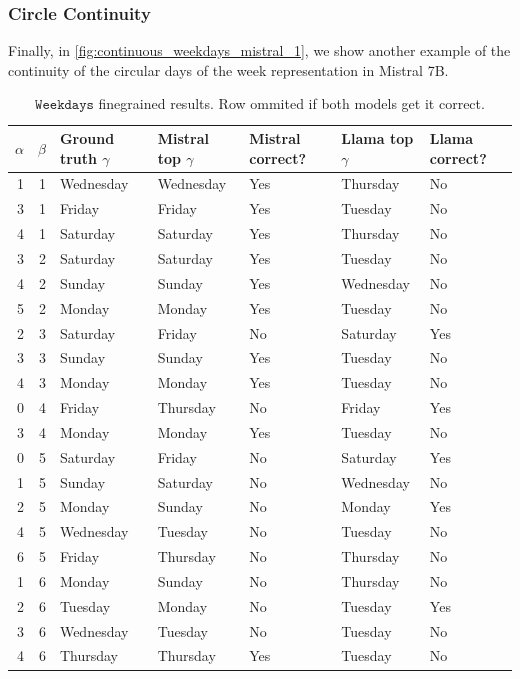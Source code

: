 \documentclass{article} %
\theoremstyle{plain}
\theoremstyle{definition}
\begin{document}
\subsubsection{Circle Continuity}

Finally, in \cref{fig:continuous_weekdays_mistral_1}, we show another example of the continuity of the circular days of the week representation in Mistral 7B.

\begin{table}
\caption{$\texttt{Weekdays}$ finegrained results. Row ommited if both models get it correct.}
\label{tab:weekdays_finegrained}
\begin{tabular}{rrlllll}
\toprule
$\alpha$ & $\beta$ & Ground truth $\gamma$ & Mistral top $\gamma$ & Mistral correct? & Llama top $\gamma$ & Llama correct? \\
\midrule
1 & 1 & Wednesday & Wednesday & Yes & Thursday & No \\
3 & 1 & Friday & Friday & Yes & Tuesday & No \\
4 & 1 & Saturday & Saturday & Yes & Thursday & No \\
3 & 2 & Saturday & Saturday & Yes & Tuesday & No \\
4 & 2 & Sunday & Sunday & Yes & Wednesday & No \\
5 & 2 & Monday & Monday & Yes & Tuesday & No \\
2 & 3 & Saturday & Friday & No & Saturday & Yes \\
3 & 3 & Sunday & Sunday & Yes & Tuesday & No \\
4 & 3 & Monday & Monday & Yes & Tuesday & No \\
0 & 4 & Friday & Thursday & No & Friday & Yes \\
3 & 4 & Monday & Monday & Yes & Tuesday & No \\
0 & 5 & Saturday & Friday & No & Saturday & Yes \\
1 & 5 & Sunday & Saturday & No & Wednesday & No \\
2 & 5 & Monday & Sunday & No & Monday & Yes \\
4 & 5 & Wednesday & Tuesday & No & Tuesday & No \\
6 & 5 & Friday & Thursday & No & Thursday & No \\
1 & 6 & Monday & Sunday & No & Thursday & No \\
2 & 6 & Tuesday & Monday & No & Tuesday & Yes \\
3 & 6 & Wednesday & Tuesday & No & Tuesday & No \\
4 & 6 & Thursday & Thursday & Yes & Tuesday & No \\

\end{tabular}
\end{table}
\end{document}
